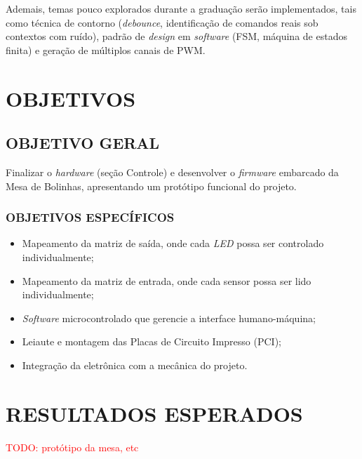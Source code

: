   Ademais, temas pouco explorados durante a graduação serão implementados, tais como técnica de contorno (\emph{debounce}, identificação de comandos reais sob contextos com ruído), padrão de \emph{design} em \emph{software} (FSM, máquina de estados finita) e geração de múltiplos canais de PWM.

\section{OBJETIVOS}
\label{sec:objetivos}

\subsection{OBJETIVO GERAL}
Finalizar o \emph{hardware} (seção Controle) e desenvolver o \emph{firmware} embarcado da Mesa de Bolinhas, apresentando um protótipo funcional do projeto.

\subsubsection{OBJETIVOS ESPECÍFICOS}
  \begin{itemize}
      \item Mapeamento da matriz de saída, onde cada \emph{LED} possa ser controlado individualmente;
      \item Mapeamento da matriz de entrada, onde cada sensor possa ser lido individualmente;
      \item \emph{Software} microcontrolado que gerencie a interface humano-máquina;
      \item Leiaute e montagem das Placas de Circuito Impresso (PCI);
      \item Integração da eletrônica com a mecânica do projeto.
  \end{itemize}
  
  \section{RESULTADOS ESPERADOS}
  \label{sec:resultadosesperados}
  
  \textcolor{red}{TODO: protótipo da mesa, etc}
